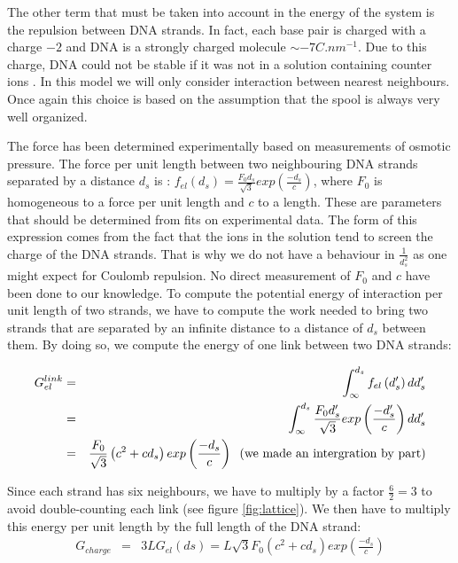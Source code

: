 \documentclass{article}
\begin{document}
The other term that must be taken into account in the energy of the system is the repulsion between DNA strands. In fact, each base pair is charged with a charge $-2$ \cite{alberts2002} and DNA is a strongly charged molecule $ \sim - 7 C.nm^{-1} $. Due to this charge, DNA could not be stable if it was not in a solution containing counter ions \cite{singh2015}. In this model we will only consider interaction between nearest neighbours. Once again this choice is based on the assumption that the spool is always very well organized.

The force has been determined experimentally based on measurements of osmotic pressure. The force per unit length between two neighbouring DNA strands separated by a distance $d_s$ is : $f_{el} \left(d_s\right) = \frac{F_0 d_s}{\sqrt{3}} exp \left(\frac{-d_s}{c}\right) $, where $F_0$ is homogeneous to a force per unit length and $c$ to a length. These are parameters that should be determined from fits on experimental data. The form of this expression comes from the fact that the ions in the solution tend to screen the charge of the DNA strands. That is why we do not have a behaviour in $\frac{1}{d_s^2}$ as one might expect for Coulomb repulsion. No direct measurement of $F_0$ and $c$ have been done to our knowledge. \cite{purohit2003} To compute the potential energy of interaction per unit length of two strands, we have to compute the work needed to bring two strands that are separated by an infinite distance to a distance of $d_s$ between them. By doing so, we compute the energy of one link between two DNA strands:

\begin{eqnarray*}
    G_{el}^{link} &=& \int_{\infty}^{d_s} f_{el} \left( d'_s \right) dd'_s \\
    & = & \int_{\infty}^{d_s} \frac{F_0 d'_s}{\sqrt{3}} exp \left(\frac{-d'_s}{c}\right) dd'_s \\
    & = & \frac{F_0}{\sqrt{3}} \left( c^2 + cd_s \right) exp \left( \frac{- d_s}{c} \right) \;\; \textnormal{(we made an intergration by part)} \label{eq:gelec}
\end{eqnarray*}

Since each strand has six neighbours, we have to multiply by a factor $\frac{6}{2} = 3$ to avoid double-counting each link (see figure \ref{fig:lattice}). We then have to multiply this energy per unit length by the full length of the DNA strand:
\begin{eqnarray}
    G_{charge} &=& 3 L G_{el}\left(ds\right) = L\sqrt{3} F_0 \left( c^2 + cd_s \right) exp \left( \frac{- d_s}{c} \right) \label{eq:gcharge}
\end{eqnarray}
\end{document}
